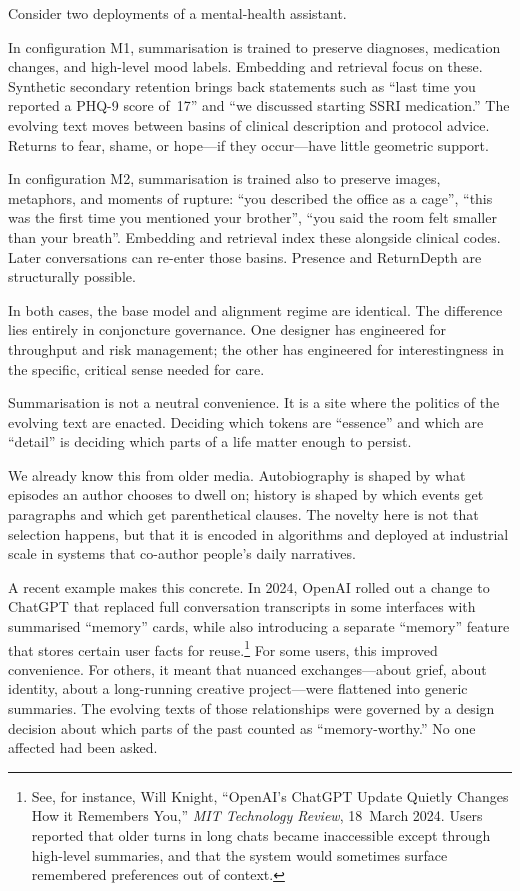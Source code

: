 Consider two deployments of a mental-health assistant.

In configuration M1, summarisation is trained to preserve diagnoses, medication changes, and high-level mood labels. Embedding and retrieval focus on these. Synthetic secondary retention brings back statements such as ``last time you reported a PHQ-9 score of~17'' and ``we discussed starting SSRI medication.'' The evolving text moves between basins of clinical description and protocol advice. Returns to fear, shame, or hope---if they occur---have little geometric support.

In configuration M2, summarisation is trained also to preserve images, metaphors, and moments of rupture: ``you described the office as a cage'', ``this was the first time you mentioned your brother'', ``you said the room felt smaller than your breath''. Embedding and retrieval index these alongside clinical codes. Later conversations can re-enter those basins. Presence and ReturnDepth are structurally possible.

In both cases, the base model and alignment regime are identical. The difference lies entirely in conjoncture governance. One designer has engineered for throughput and risk management; the other has engineered for interestingness in the specific, critical sense needed for care.

Summarisation is not a neutral convenience. It is a site where the politics of the evolving text are enacted. Deciding which tokens are ``essence'' and which are ``detail'' is deciding which parts of a life matter enough to persist.

We already know this from older media. Autobiography is shaped by what episodes an author chooses to dwell on; history is shaped by which events get paragraphs and which get parenthetical clauses. The novelty here is not that selection happens, but that it is encoded in algorithms and deployed at industrial scale in systems that co-author people's daily narratives.

A recent example makes this concrete. In 2024, OpenAI rolled out a change to ChatGPT that replaced full conversation transcripts in some interfaces with summarised ``memory'' cards, while also introducing a separate ``memory'' feature that stores certain user facts for reuse.\footnote{See, for instance, Will Knight, ``OpenAI's ChatGPT Update Quietly Changes How it Remembers You,'' \emph{MIT Technology Review}, 18~March 2024. Users reported that older turns in long chats became inaccessible except through high-level summaries, and that the system would sometimes surface remembered preferences out of context.} For some users, this improved convenience. For others, it meant that nuanced exchanges---about grief, about identity, about a long-running creative project---were flattened into generic summaries. The evolving texts of those relationships were governed by a design decision about which parts of the past counted as ``memory-worthy.'' No one affected had been asked.

